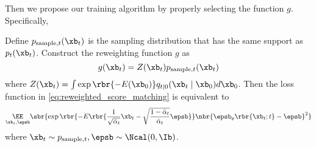 Then we propose our training algorithm by properly selecting the function $g$. Specifically,
\begin{theorem}
    Define $p_{{\rm sample},t}(\xb_t)$ is the sampling distribution that has the same support as $p_t(\xb_t)$.
    Construct the reweighting function $g$ as 
    \begin{equation}
        g(\xb_t) = Z(\xb_t)p_{{\rm sample},t}(\xb_t)\label{eq:reweighting_g}
    \end{equation}
    where $Z(\xb_t) = \int\exp\rbr{-E(\xb_0)}q_{t|0}(\xb_t\mid \xb_0)d\xb_0$. Then the loss function in \eqref{eq:reweighted_score_matching} is equivalent to
    {
    \small
    \begin{equation}
        \underset{\xb_t,\epsb}{\EE}\sbr{\exp \rbr{-E\rbr{\frac{1}{\sqrt{\bar\alpha_t}}\xb_t - \sqrt{\frac{1 - \bar\alpha_t}{\bar\alpha_t}}\epsb}}\nbr{\epsb_\theta\rbr{\xb_t;t} - \epsb}^2}\label{eq:thm1_reweight_loss}
    \end{equation}
    }
    where $\xb_t\sim p_{{\rm sample},t},\epsb\sim\Ncal(0, \Ib)$.
\end{theorem}
